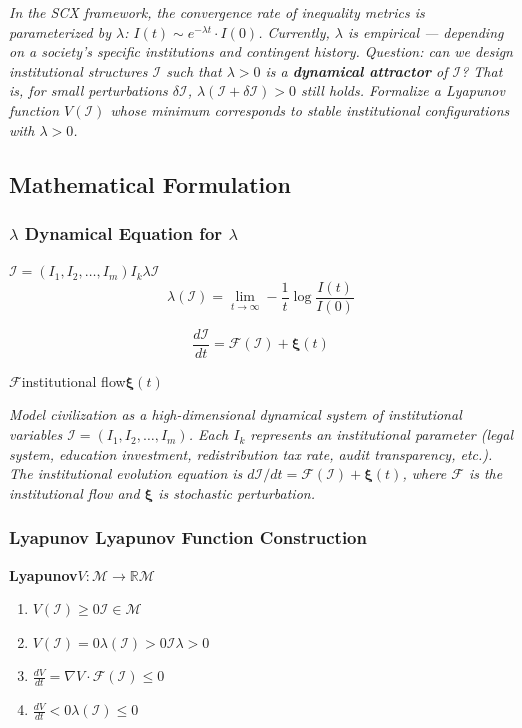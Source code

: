 \documentclass[12pt,a4paper]{article}
\theoremstyle{remark}
\newcommand{\R}{\mathbb{R}}
\newcommand{\F}{\mathcal{F}}
\begin{document}
\medskip
\noindent\textit{In the SCX framework, the convergence rate of inequality metrics is parameterized by $\lambda$: $I(t) \sim e^{-\lambda t} \cdot I(0)$. Currently, $\lambda$ is empirical — depending on a society's specific institutions and contingent history. Question: can we design institutional structures $\mathcal{I}$ such that $\lambda > 0$ is a \textbf{dynamical attractor} of $\mathcal{I}$? That is, for small perturbations $\delta\mathcal{I}$, $\lambda(\mathcal{I} + \delta\mathcal{I}) > 0$ still holds. Formalize a Lyapunov function $V(\mathcal{I})$ whose minimum corresponds to stable institutional configurations with $\lambda > 0$.}

\subsection{ Mathematical Formulation}

\subsubsection{$\lambda$ Dynamical Equation for $\lambda$}

$\mathcal{I} = (I_1, I_2, \ldots, I_m)$$I_k$$\lambda$$\mathcal{I}$
\begin{equation}
    \lambda(\mathcal{I}) = \lim_{t \to \infty} -\frac{1}{t} \log \frac{I(t)}{I(0)}
\end{equation}


\begin{equation}
    \frac{d\mathcal{I}}{dt} = \F(\mathcal{I}) + \boldsymbol{\xi}(t)
\end{equation}

$\F$\textbf{}institutional flow$\boldsymbol{\xi}(t)$

\medskip
\noindent\textit{Model civilization as a high-dimensional dynamical system of institutional variables $\mathcal{I} = (I_1, I_2, \ldots, I_m)$. Each $I_k$ represents an institutional parameter (legal system, education investment, redistribution tax rate, audit transparency, etc.). The institutional evolution equation is $d\mathcal{I}/dt = \F(\mathcal{I}) + \boldsymbol{\xi}(t)$, where $\F$ is the institutional flow and $\boldsymbol{\xi}$ is stochastic perturbation.}

\subsubsection{Lyapunov Lyapunov Function Construction}

\textbf{Lyapunov}$V: \mathcal{M} \to \R$$\mathcal{M}$
\begin{enumerate}[label=(\roman*)]
    \item $V(\mathcal{I}) \geq 0$$\mathcal{I} \in \mathcal{M}$
    \item $V(\mathcal{I}) = 0$$\lambda(\mathcal{I}) > 0$$\mathcal{I}$$\lambda > 0$
    \item $\frac{dV}{dt} = \nabla V \cdot \F(\mathcal{I}) \leq 0$
    \item $\frac{dV}{dt} < 0$$\lambda(\mathcal{I}) \leq 0$
\end{enumerate}
\end{document}

